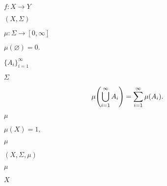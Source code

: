 \documentclass[10pt]{book}
\begin{document}
\begin{mdSnippets}
\begin{mdInlineSnippet}[2385fde6b300ad088e0c2711c9da8a74]
$f: X \to Y$\end{mdInlineSnippet}%
\begin{mdInlineSnippet}[4f63e1397362dfddde7f9605fc68fb64]%
$(X, \Sigma)$\end{mdInlineSnippet}%
\begin{mdInlineSnippet}%
$\mu: \Sigma \to [0, \infty]$\end{mdInlineSnippet}%
\begin{mdInlineSnippet}%
$\mu(\varnothing) = 0.$\end{mdInlineSnippet}%
\begin{mdInlineSnippet}[285e38d14735127a14e606e4b16c8dab]%
$\{A_i\}_{i=1}^\infty$\end{mdInlineSnippet}%
\begin{mdInlineSnippet}[025b3f94d79319f2067156076bf05243]%
$\Sigma$\end{mdInlineSnippet}%
\begin{mdDisplaySnippet}[8f71eb3be455c60b59d830519c7a0b97]%
\[%
\mu\qty(\bigcup_{i=1}^\infty A_i) = \sum_{i=1}^\infty \mu(A_i).
\]%
\end{mdDisplaySnippet}%
\begin{mdInlineSnippet}%
$\mu$\end{mdInlineSnippet}%
\begin{mdInlineSnippet}%
$\mu(X) = 1,$\end{mdInlineSnippet}%
\begin{mdInlineSnippet}%
$\mu$\end{mdInlineSnippet}%
\begin{mdInlineSnippet}[4429e97c6c5c5e3f564fdfd53852bb3b]%
$(X, \Sigma, \mu)$\end{mdInlineSnippet}%
\begin{mdInlineSnippet}%
$\mu$\end{mdInlineSnippet}%
\begin{mdInlineSnippet}[02129bb861061d1a052c592e2dc6b383]%
$X$\end{mdInlineSnippet}%
\begin{mdInlineSnippet}[9c3729f1b2ef77b97bbdb1135d803c69]%

\end{mdInlineSnippet}
\end{mdSnippets}
\end{document}
